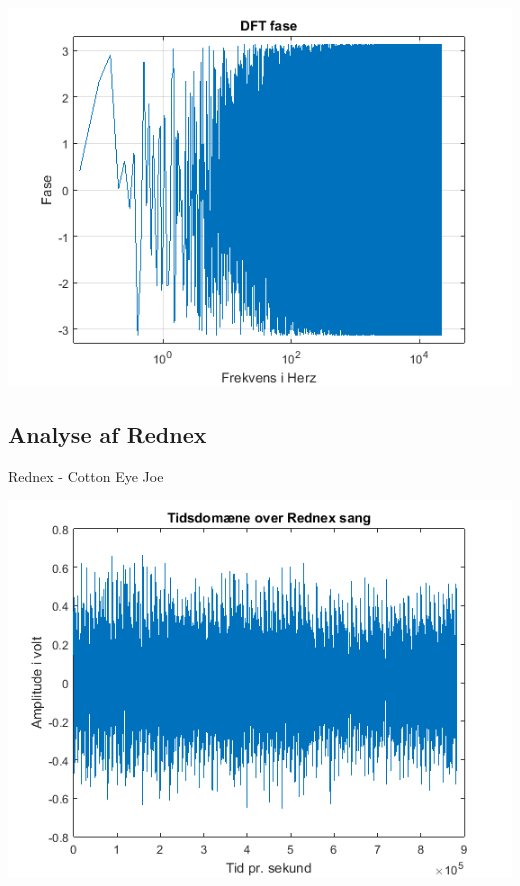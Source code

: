 \documentclass[12pt, letterpaper]{article}
\begin{document}
\begin{center}
\includegraphics[width=\textwidth]{billeder/arcticfase}
\end{center}

\subsection{Analyse af Rednex}
Rednex - Cotton Eye Joe 

\begin{center}
\includegraphics[width=\textwidth]{billeder/rednextid}
\end{center}
\end{document}
